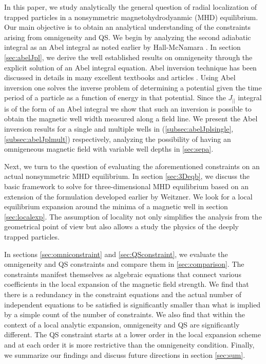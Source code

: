 \documentclass[aip,pop,reprint]{revtex4-1}
\newcommand*{\Jpl}{J_{||}}
\begin{document}
In this paper, we study analytically the general question of radial localization of trapped particles in a nonsymmetric magnetohydrodyanmic (MHD) equilibrium. Our main objective is to obtain an analytical understanding of the constraints arising from omnigeneity and QS. We begin by analyzing the second adiabatic integral as an Abel integral as noted earlier by Hall-McNamara \cite{hall1975three}. In section \ref{sec:abelJpl}, we derive the well established results on omnigeneity through the explicit solution of an Abel integral equation. Abel inversion technique has been discussed in details in many excellent textbooks\cite{whittaker_watson_1996,bocher1914introduction,bracewell1986fourier} and articles \cite{keller_inv_problem}. Using Abel inversion one solves the inverse problem of determining a potential given the time period of a particle as a function of energy in that potential. Since the $\Jpl$ integral is of the form of an Abel integral \cite{hall1975three} we show that such an inversion is possible to obtain the magnetic well width measured along a field line. We present the Abel inversion results for a single and multiple wells in (\ref{subsec:abelJplsingle},\ref{subsec:abelJplmult}) respectively, analyzing the possibility of having an omnigeneous magnetic field with variable well depths in \ref{sec:sepa}.


Next, we turn to the question of evaluating the aforementioned constraints on an actual nonsymmetric MHD equilibrium. In section \ref{sec:3Deqb}, we discuss the basic framework to solve for three-dimensional MHD equilibrium based on an extension of the formulation developed earlier by Weitzner\cite{weitzner2016expansions}. We look for a local equilibrium expansion around the minima of a magnetic well in section \ref{sec:localexp}. The assumption of locality not only simplifies the analysis from  the geometrical point of view but also allows a study the physics of the deeply trapped particles. 

In sections \ref{sec:omniconstraint} and \ref{sec:QSconstraint}, we evaluate the omnigeneity and QS constraints and compare them in \ref{sec:comparison}. The constraints manifest themselves as algebraic equations that connect various coefficients in the local expansion of the magnetic field strength. We find that there is a redundancy in the constraint equations and the actual number of independent equations to be satisfied is significantly smaller than what is implied by a simple count of the number of constraints. We also find that within the context of a local analytic expansion, omnigeneity and QS are significantly different. The QS constraint starts at a lower order in the local expansion scheme and at each order it is more restrictive than the omnigeneity condition. Finally, we summarize our findings and discuss future directions in section \ref{sec:sum}. 
\end{document}
